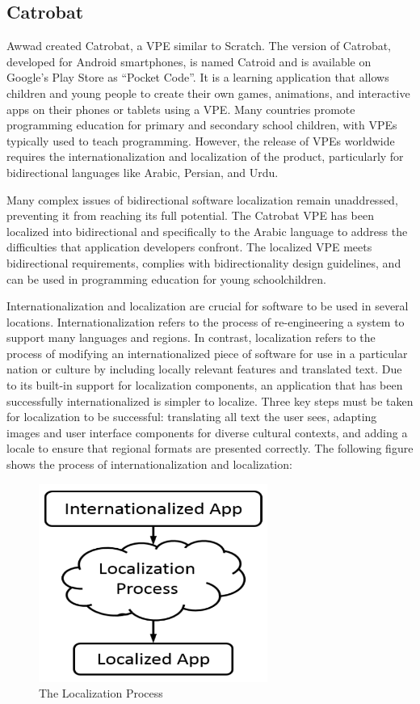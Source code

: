 \subsection{Catrobat}
Awwad \cite{awwad2017localization} created Catrobat, a VPE similar to Scratch. The version of Catrobat, developed for Android smartphones, is named Catroid \cite{slany2012mobile} and is available on Google’s Play Store as ``Pocket Code”. It is a learning application that allows children and young people to create their own games, animations, and interactive apps on their phones or tablets using a VPE. Many countries promote programming education for primary and secondary school children, with VPEs typically used to teach programming. However, the release of VPEs worldwide requires the internationalization and localization of the product, particularly for bidirectional languages like Arabic, Persian, and Urdu. 

Many complex issues of bidirectional software localization remain unaddressed, preventing it from reaching its full potential. The Catrobat VPE has been localized into bidirectional and specifically to the Arabic language to address the difficulties that application developers confront. The localized VPE meets bidirectional requirements, complies with bidirectionality design guidelines, and can be used in programming education for young schoolchildren.

Internationalization and localization are crucial for software to be used in several locations. Internationalization refers to the process of re-engineering a system to support many languages and regions. In contrast, localization refers to the process of modifying an internationalized piece of software for use in a particular nation or culture by including locally relevant features and translated text. Due to its built-in support for localization components, an application that has been successfully internationalized is simpler to localize. Three key steps must be taken for localization to be successful: translating all text the user sees, adapting images and user interface components for diverse cultural contexts, and adding a locale to ensure that regional formats are presented correctly. The following figure shows the process of internationalization and localization:

\begin{figure}[H]
\centering
\includegraphics[width=7.5cm]{ch2-images/catrobat.png}
\caption{The Localization Process \cite{awwad2017localization}}
\label{fig:The Localization Process}
\end{figure} 

